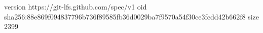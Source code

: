 version https://git-lfs.github.com/spec/v1
oid sha256:88e869f094837796b736f89585fb36d0029ba7f9570a54f30ce3fcdd42b662f8
size 2399
